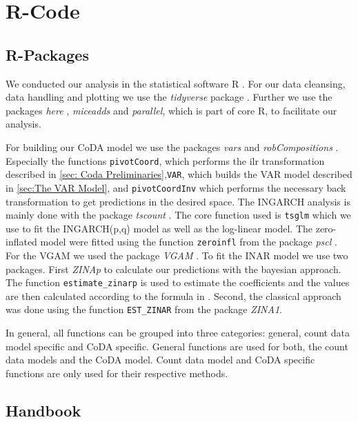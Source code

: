 \section{R-Code}
\label{sec:R-Code}

\subsection{R-Packages}
\label{sec:R-Packages}

We conducted our analysis in the statistical software R \cite{R:2022}. For our data cleansing, data handling and plotting we use the \textit{tidyverse} package \cite{Tidyverse:2019}. Further we use the packages \textit{here} \cite{here:2020}, \textit{miceadds} \cite{Miceadds:2023} and \textit{parallel}, which is part of core R, to facilitate our analysis.  

For building our CoDA model we use the packages \textit{vars} \cite{VAR:2008,CoDAR2:2008} and \textit{robCompositions} \cite{RobComp:2011,CoDAR4:2018}. Especially the functions \texttt{pivotCoord}, which performs the ilr transformation described in \ref{sec: Coda Preliminaries},\texttt{VAR}, which builds the VAR model described in \ref{sec:The VAR Model}, and \texttt{pivotCoordInv} which performs the necessary back transformation to get predictions in the desired space. The INGARCH analysis is mainly done with the package \textit{tscount} \cite{Tscount:2017,Tscount:2020}. The core function used is \texttt{tsglm} which we use to fit the INGARCH(p,q) model as well as the log-linear model. The zero-inflated model were fitted using the function \texttt{zeroinfl} from the package \textit{pscl} \cite{Pscl:2008}. For the VGAM we used the package \textit{VGAM} \cite{RVGAM:2010}. To fit the INAR model we use two packages. First \textit{ZINAp} to calculate our predictions with the bayesian approach. The function \texttt{estimate\_zinarp} is used to estimate the coefficients and the values are then calculated according to the formula in \cite{Silva:2009}. Second, the classical approach was done using the function \texttt{EST\_ZINAR} from the package \textit{ZINA1}.

In general, all functions can be grouped into three categories: general, count data model specific and CoDA specific. General functions are used for both, the count data models and the CoDA model. Count data model and CoDA specific functions are only used for their respective methods.
\subsection{Handbook}
\label{sec:Handbook}

